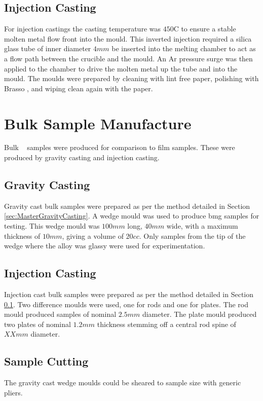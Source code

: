\documentclass[a4paper,12pt,oneside]{report}%
\begin{document}
\subsection{Injection Casting} \label{sec:MasterInjectionCasting}

For injection castings the casting temperature was $450$\degree C to ensure a stable molten metal flow front into the mould. This inverted injection required a silica glass tube of inner diameter $4mm$ be inserted into the melting chamber to act as a flow path between the crucible and the mould. An Ar pressure surge was then applied to the chamber to drive the molten metal up the tube and into the mould. The moulds were prepared by cleaning with lint free paper, polishing with Brasso \textcopyright, and wiping clean again with the paper. 

\section{Bulk Sample Manufacture}
Bulk \MgZnCa~ samples were produced for comparison to film samples. These were produced by gravity casting and injection casting. 

\subsection{Gravity Casting}
Gravity cast bulk samples were prepared as per the method detailed in Section \ref{sec:MasterGravityCasting}. A wedge mould was used to produce \gls{bmg} samples for testing. This wedge mould was $100mm$ long, $40mm$ wide, with a maximum thickness of $10mm$, giving a volume of $20cc$. Only samples from the tip of the wedge where the alloy was glassy were used for experimentation. 

\subsection{Injection Casting}
Injection cast bulk samples were prepared as per the method detailed in Section \ref{sec:MasterInjectionCasting}. Two difference moulds were used, one for rods and one for plates. The rod mould produced samples of nominal $2.5 mm$ diameter. The plate mould produced two plates of nominal $1.2 mm$ thickness stemming off a central rod spine of $XX mm$ diameter.  

\subsection{Sample Cutting}
The gravity cast wedge moulds could be sheared to sample size with generic pliers. 
\end{document}
